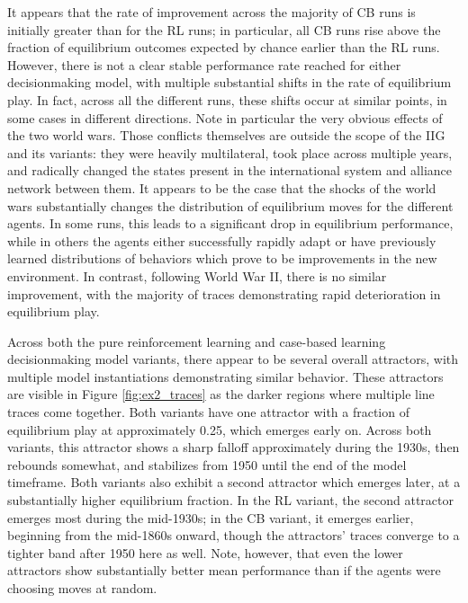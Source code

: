 It appears that the rate of improvement across the majority of CB runs is initially greater than for the RL runs; in particular, all CB runs rise above the fraction of equilibrium outcomes expected by chance earlier than the RL runs. However, there is not a clear stable performance rate reached for either decisionmaking model, with multiple substantial shifts in the rate of equilibrium play. In fact, across all the different runs, these shifts occur at similar points, in some cases in different directions. Note in particular the very obvious effects of the two world wars. Those conflicts themselves are outside the scope of the IIG and its variants: they were heavily multilateral, took place across multiple years, and radically changed the states present in the international system and alliance network between them. It appears to be the case that the shocks of the world wars substantially changes the distribution of equilibrium moves for the different agents. In some runs, this leads to a significant drop in equilibrium performance, while in others the agents either successfully rapidly adapt or have previously learned distributions of behaviors which prove to be improvements in the new environment. In contrast, following World War II, there is no similar improvement, with the majority of traces demonstrating rapid deterioration in equilibrium play. 

Across both the pure reinforcement learning and case-based learning decisionmaking model variants, there appear to be several overall attractors, with multiple model instantiations demonstrating similar behavior. These attractors are visible in Figure \ref{fig:ex2_traces} as the darker regions where multiple line traces come together. Both variants have one attractor with a fraction of equilibrium play at approximately 0.25, which emerges early on. Across both variants, this attractor shows a sharp falloff approximately during the 1930s, then rebounds somewhat, and stabilizes from 1950 until the end of the model timeframe. Both variants also exhibit a second attractor which emerges later, at a substantially higher equilibrium fraction. In the RL variant, the second attractor emerges most during the mid-1930s; in the CB variant, it emerges earlier, beginning from the mid-1860s onward, though the attractors' traces converge to a tighter band after 1950 here as well. Note, however, that even the lower attractors show substantially better mean performance than if the agents were choosing moves at random.

